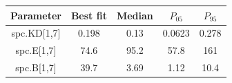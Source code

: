 \begin{tabular}{ccccc}
\toprule
Parameter & Best fit & Median & $P_{05}$ & $P_{95}$\\
\midrule
spc.KD[1,7] & 0.198 & 0.13 & 0.0623 & 0.278\\
spc.E[1,7] & 74.6 & 95.2 & 57.8 & 161\\
spc.B[1,7] & 39.7 & 3.69 & 1.12 & 10.4\\
\bottomrule
\end{tabular}
